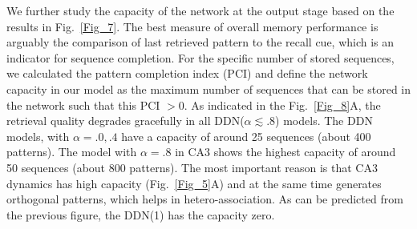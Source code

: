 \documentclass[utf8]{frontiersSCNS} %
\begin{document}
We further study the capacity of the network at the output stage based on the results in Fig.~\ref{Fig_7}. 
The best measure of overall memory performance is arguably the comparison of last retrieved pattern to the recall cue, which is an indicator for sequence completion.
%
For the specific number of stored sequences, we calculated the pattern completion index (PCI) and define the network capacity in our model as the maximum number of sequences that can be stored in the network such that this PCI $> 0$.
%
As indicated in the Fig.~\ref{Fig_8}A, the retrieval quality degrades gracefully in all DDN($\alpha \lesssim .8$)  models.
% 
The DDN models, with $\alpha = .0, .4$ have a capacity of around 25 sequences (about 400 patterns).
%
The model with $\alpha = .8$ in CA3 shows the highest capacity of around 50 sequences (about 800 patterns).
%
The most important reason is that CA3 dynamics has high capacity (Fig.~\ref{Fig_5}A) and at the same time generates orthogonal patterns, which helps in hetero-association.  
%
As can be predicted from the previous figure, the DDN(1) has the capacity zero. 
\end{document}
